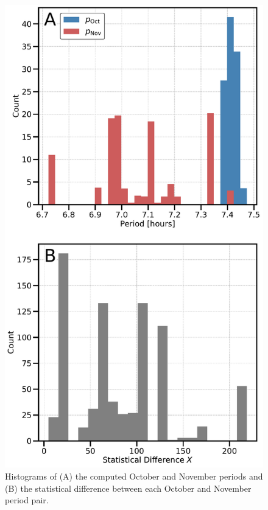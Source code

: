 \documentclass[twocolumn,doublespacing]{aastex631}
\begin{document}
\begin{figure}
\centering
    \includegraphics[width=\linewidth,angle=0]{period_comp_hist.pdf}
    \caption{ Histograms of (A) the computed October and November periods and (B) the statistical difference between each October and November period pair.}
    \label{fig:percomphist}
\end{figure}
\end{document}
